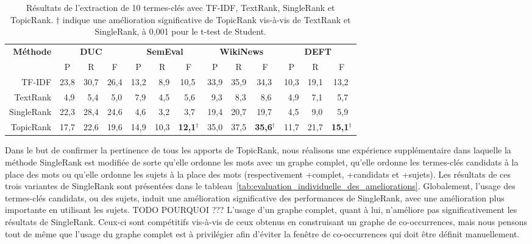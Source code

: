     \begin{table}
      \centering
      \begin{tabular}{@{~}r@{~~}c@{~~}c@{~~}c@{~~}c@{~~}c@{~~}c@{~~}c@{~~}c@{~~}c@{~~}c@{~~}c@{~~}c@{~}}
        \toprule
        \multirow{2}{*}[-2pt]{\textbf{Méthode}} & \multicolumn{3}{c}{\textbf{DUC}} & \multicolumn{3}{c}{\textbf{SemEval}} & \multicolumn{3}{c}{\textbf{WikiNews}} & \multicolumn{3}{c}{\textbf{DEFT}}\\
        \cmidrule(r){2-4}\cmidrule(r){5-7}\cmidrule(r){8-10}\cmidrule{11-13}
        & P & R & F & P & R & F & P & R & F & P & R & F\\
        \midrule
        TF-IDF & 23,8 & 30,7 & 26,4 & 13,2 & $~~$8,9 & 10,5$^{~}$ & 33,9 & 35,9 & 34,3$^{~}$ & 10,3 & 19,1 & 13,2$^{~}$\\
        TextRank & $~~$4,9 & $~~$5,4 & $~~$5,0 & $~~$7,9 & $~~$4,5 & $~~$5,6$^{~}$ & $~~$9,3 & $~~$8,3 & $~~$8,6$^{~}$ & $~~$4,9 & $~~$7,1 & $~~$5,7$^{~}$\\
        SingleRank & 22,3 & 28,4 & 24,6 & $~~$4,6 & $~~$3,2 & $~~$3,7$^{~}$ & 19,4 & 20,7 & 19,7$^{~}$ & $~~$4,5 & $~~$9,0 & $~~$5,9$^{~}$\\
        TopicRank & 17,7 & 22,6 & 19,6 & 14,9 & 10,3 & \textbf{12,1}$^\dagger$ & 35,0 & 37,5 & \textbf{35,6}$^\dagger$ & 11,7 & 21,7 & \textbf{15,1}$^\dagger$\\
        \bottomrule
      \end{tabular}
      \caption{Résultats de l'extraction de 10 termes-clés avec TF-IDF,
               TextRank, SingleRank et TopicRank. $\dagger$ indique une
               amélioration significative de TopicRank vis-à-vis de TextRank et
               SingleRank, à 0,001 pour le t-test de Student.
               \label{tab:resultats_globaux}}
    \end{table}

    Dans le but de confirmer la pertinence de tous les apports de TopicRank,
    nous réalisons une expérience supplémentaire dans laquelle la méthode
    SingleRank est modifiée de sorte qu'elle ordonne les mots avec un graphe
    complet, qu'elle ordonne les termes-clés candidats à la place des mots ou
    qu'elle ordonne les sujets à la place des mots (respectivement +complet,
    +candidats et +sujets). Les résultats de ces trois variantes de SingleRank
    sont présentées dans le
    tableau~\ref{tab:evaluation_individuelle_des_ameliorations}. Globalement,
    l'usage des termes-clés candidats, ou des sujets, induit une amélioration
    significative des performances de SingleRank, avec une amélioration plus
    importante en utilisant les sujets.
    TODO POURQUOI ???
    L'usage d'un graphe complet, quant à lui, n'améliore pas significativement
    les résultats de SingleRank. Ceux-ci sont compétitifs vis-à-vis de ceux
    obtenus en construisant un graphe de co-occurrences, mais nous pensons tout
    de même que l'usage du graphe complet est à privilégier afin d'éviter la
    fenêtre de co-occurrences qui doit être définit manuellement.
    
